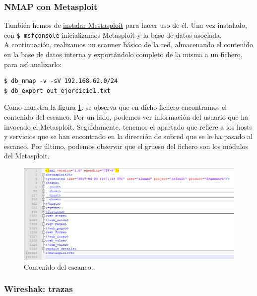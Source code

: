 \documentclass[a4,12pt,onecolum]{article}
\begin{document}
\subsubsection{NMAP con Metasploit}

También hemos de \href{https://github.com/rapid7/metasploit-framework/wiki/Nightly-Installers}{instalar Mestasploit} para hacer uso de él. Una vez instalado, con \texttt{\$ msfconsole} inicializamos Metasploit y la base de datos asociada. \\

A continuación, realizamos un scanner básico de la red, almacenando el contenido en la base de datos interna y exportándolo completo de la misma a un fichero, para así analizarlo:

\begin{verbatim}
$ db_nmap -v -sV 192.168.62.0/24
$ db_export out_ejercicio1.txt
\end{verbatim}

Como muestra la figura \ref{fig:nmap4}, se observa que en dicho fichero encontramos el contenido del escaneo. Por un lado, podemos ver información del usuario que ha invocado el Metasploit. Seguidamente, tenemos el apartado que refiere a los hosts y servicios que se han encontrado en la dirección de subred que se le ha pasado al escaneo. Por último, podemos observar que el grueso del fichero son los módulos del Metasploit.

\begin{figure}[htbp]
\centering
\includegraphics[width=1.0\textwidth]{./images/Atacante_scaner_y_BBDD.png}
\caption{Contenido del escaneo.}
\label{fig:nmap4}
\end{figure}


\subsubsection{Wireshak: trazas}
\end{document}

